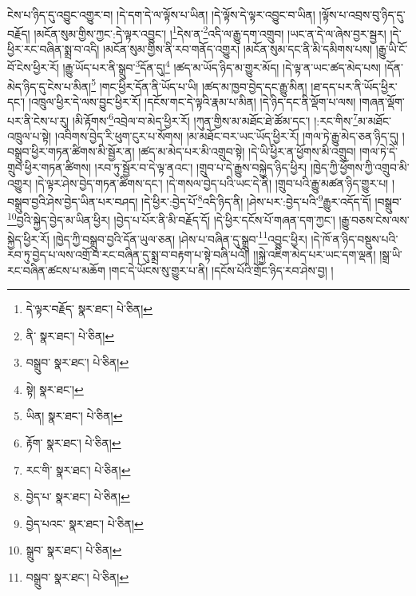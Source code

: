 ངེས་པ་ཉིད་དུ་འབྱུང་འགྱུར་བ། །དེ་དག་དེ་ལ་ལྟོས་པ་ཡིན། །དེ་ལྟོས་དེ་ལྟར་འབྱུང་བ་ཡིན། །ལྟོས་པ་འབྲས་བུ་ཉིད་དུ་བརྗོད། །མངོན་སུམ་གྱིས་ཀྱང་:དེ་ལྟར་འབྱུང་། །\footnote{དེ་ལྟར་བརྗོད་  སྣར་ཐང་།  པེ་ཅིན། }དེས་ན་\footnote{ནི་  སྣར་ཐང་།  པེ་ཅིན། }འདི་ལ་རྒྱུ་དག་འགྲུབ། །ཡང་ན་དེ་ལ་ཞེས་བྱར་སྦྱར། །དེ་ཕྱིར་རང་བཞིན་སྨྲ་བ་འདི། །མངོན་སུམ་གྱིས་ནི་རབ་གནོད་འགྱུར། །མངོན་སུམ་དང་ནི་མི་དམིགས་པས། །རྒྱུ་ཡི་ངོ་བོ་ངེས་ཕྱིར་རོ། །རྒྱུ་ཡོད་པར་ནི་སྒྲུབ་\footnote{བསྒྲུབ་  སྣར་ཐང་།  པེ་ཅིན། }དོན་དུ།\footnote{སྟེ།  སྣར་ཐང་། } །ཚད་མ་ཡོད་ཉིད་མ་གྱུར་མོད། །དེ་ལྟ་ན་ཡང་ཚད་མེད་པས། །དོན་མེད་ཉིད་དུ་ངེས་པ་མིན།\footnote{ཡིན།  སྣར་ཐང་།  པེ་ཅིན། } །གང་ཕྱིར་དོན་ནི་ཡོད་པ་ཡི། །ཚད་མ་ཁྱབ་བྱེད་དང་རྒྱུ་མིན། །ཐ་དད་པར་ནི་ཡོད་ཕྱིར་དང་། །འཁྲུལ་ཕྱིར་དེ་ལས་བྱུང་ཕྱིར་རོ། །དངོས་གང་དེ་ལྟའི་རྣམ་པ་མིན། །དེ་ཉིད་དང་ནི་ལྡོག་པ་ལས། །གཞན་ལྡོག་པར་ནི་ངེས་པ་རུ། །མི་རྟོགས་\footnote{རྟོག་  སྣར་ཐང་།  པེ་ཅིན། }འབྲེལ་བ་མེད་ཕྱིར་རོ། །ཀུན་གྱིས་མ་མཐོང་ཐེ་ཚོམ་དང་། །:རང་གིས་\footnote{རང་གི་  སྣར་ཐང་།  པེ་ཅིན། }མ་མཐོང་འཁྲུལ་པ་སྟེ། །འབིགས་བྱེད་རི་ཕུག་ངུར་པ་སོགས། །མ་མཐོང་བར་ཡང་ཡོད་ཕྱིར་རོ། །གལ་ཏེ་རྒྱུ་མེད་ཅན་ཉིད་དུ། །བསྒྲུབ་ཕྱིར་གཏན་ཚིགས་མི་སྦྱོར་ན། །ཚད་མ་མེད་པར་མི་འགྲུབ་སྟེ། །དེ་ཡི་ཕྱིར་ན་ཕྱོགས་མི་འགྲུབ། །གལ་ཏེ་དེ་གྲུབ་ཕྱིར་གཏན་ཚིགས། །རབ་ཏུ་སྦྱོར་བ་དེ་ལྟ་ནའང་། །གྲུབ་པ་དེ་རྒྱུས་བསྐྱེད་ཉིད་ཕྱིར། །ཁྱེད་ཀྱི་ཕྱོགས་ཀྱི་འགྲུབ་མི་འགྱུར། །དེ་ལྟར་ཤེས་བྱེད་གཏན་ཚིགས་དང་། །དེ་གསལ་བྱེད་པའི་ཡང་དེ་ནི། །གྲུབ་པའི་རྒྱུ་མཚན་ཉིད་གྱུར་པ། །བསྒྲུབ་བྱའི་ཤེས་བྱེད་ཡིན་པར་བཤད། །དེ་ཕྱིར་:བྱེད་པོ་\footnote{བྱེད་པ་  སྣར་ཐང་།  པེ་ཅིན། }འདི་ཉིད་ནི། །ཤེས་པར་:བྱེད་པའི་\footnote{བྱེད་པའང་  སྣར་ཐང་།  པེ་ཅིན། }རྒྱུར་འདོད་དོ། །བསྒྲུབ་\footnote{སྒྲུབ་  སྣར་ཐང་།  པེ་ཅིན། }བྱའི་སྐྱེད་བྱེད་མ་ཡིན་ཕྱིར། །བྱེད་པ་པོར་ནི་མི་བརྗོད་དོ། །དེ་ཕྱིར་དངོས་པོ་གཞན་དག་ཀྱང་། །རྒྱུ་བཅས་ངེས་ལས་སྐྱེད་ཕྱིར་རོ། །ཁྱེད་ཀྱི་བསྒྲུབ་བྱའི་དོན་ཡུལ་ཅན། །ཤེས་པ་བཞིན་དུ་སྒྲུབ་\footnote{བསྒྲུབ་  སྣར་ཐང་།  པེ་ཅིན། }འབྱུང་ཕྱིར། །དེ་ཁོ་ན་ཉིད་བསྡུས་པའི་རབ་ཏུ་བྱེད་པ་ལས་འགྲོ་བ་རང་བཞིན་དུ་སྨྲ་བ་བརྟག་པ་སྟེ་བཞི་པའོ།། །།སྐྱེ་འཇིག་མེད་པར་ཡང་དག་ལྡན། །སྒྲ་ཡི་རང་བཞིན་ཚངས་པ་མཆོག །གང་དེ་ཡོངས་སུ་གྱུར་པ་ནི། །དངོས་པོའི་གྲོང་ཉིད་རབ་ཤེས་བྱ། །
